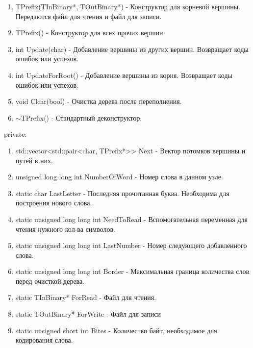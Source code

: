 \documentclass[12pt]{article}
\begin{document}
\begin{enumerate}
	\item TPrefix(TInBinary*, TOutBinary*) - Конструктор для корневой вершины. Передаются файл для чтения и файл для записи.
	\item TPrefix() - Конструктор для всех прочих вершин.
	\item int Update(char) - Добавление вершины из других вершин. Возвращает коды ошибок или успехов.
	\item int UpdateForRoot() - Добавление вершины из корня. Возвращает коды ошибок или успехов.
	\item void Clear(bool) - Очистка дерева после переполнения.
	\item $\sim$TPrefix() - Стандартный деконструктор.
\end{enumerate}
\noindent
private:

\begin{enumerate}
	\item std::vector<std::pair<char, TPrefix*>\hspace{0pt}> Next - Вектор потомков вершины и путей в них.
	\item unsigned long long int NumberOfWord - Номер слова в данном узле.
	\item static char LastLetter - Последняя прочитанная буква. Необходима для построения нового слова.
	\item static unsigned long long int NeedToRead - Вспомогательная переменная для чтения нужного кол-ва символов.
	\item static unsigned long long int LastNumber - Номер следующего добавленного слова.
	\item static unsigned long long int Border - Максимальная граница количества слов перед очисткой дерева.
	\item static TInBinary* ForRead - Файл для чтения.
	\item static TOutBinary* ForWrite - Файл для записи
	\item static unsigned short int Bites - Количество байт, необходимое для кодирования слова.
\end{enumerate}
\end{document}
